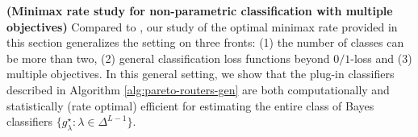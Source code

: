 \begin{remark}

{\bf (Minimax rate study for non-parametric classification with multiple objectives)}
Compared to \citet{audibert2007Fast}, our study of the optimal minimax rate provided in this section generalizes the setting on three fronts: (1) the number of classes can be more than two, (2) general classification loss functions beyond $0/1$-loss and (3) multiple objectives. In this general setting, we show that the plug-in classifiers described in Algorithm \ref{alg:pareto-routers-gen} are both computationally and statistically (rate optimal) efficient for estimating the entire class of Bayes classifiers $\{g_\lambda^\star: \lambda\in \Delta^{L-1}\}$. 
    
\end{remark}